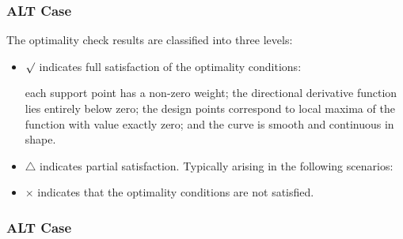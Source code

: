 \documentclass[xcolor=dvipsnames,aspectratio=1610]{beamer}
\begin{document}
\begin{frame}
\frametitle{ALT Case}
The optimality check results are classified into three levels:

\begin{itemize}
\item $\surd$ indicates full satisfaction of the optimality conditions:

each support point has a non-zero weight; the directional derivative function lies entirely below zero; the design points correspond to local maxima of the function with value exactly zero; and the curve is smooth and continuous in shape.

\item $\triangle$ indicates partial satisfaction. Typically arising in the following scenarios:

\begin{figure}
\end{figure}

\item $\times$ indicates that the optimality conditions are not satisfied.
\end{itemize}

\end{frame}





\begin{frame}
\frametitle{ALT Case}

\begin{figure}
\end{figure}

\end{frame}
\end{document}
